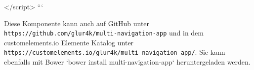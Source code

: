 </script>
```

Diese Komponente kann auch auf GitHub unter \texttt{https://github.com/glur4k/multi-navigation-app} und in dem customelements.io Elemente Katalog unter \texttt{https://customelements.io/glur4k/multi-navigation-app/}. Sie kann ebenfalls mit Bower `bower install multi-navigation-app` heruntergeladen werden.
